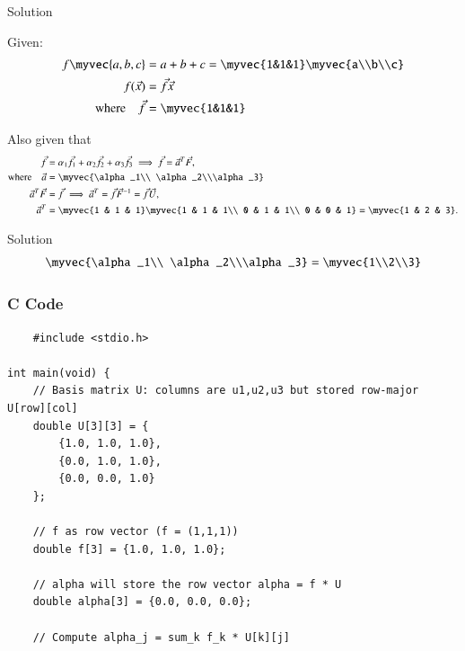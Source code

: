 \documentclass{beamer}
\begin{document}
\begin{frame}{Solution}

Given:
\begin{align}
f\myvec{a,b,c}&=a+b+c=\myvec{1&1&1}\myvec{a\\b\\c}\\
f(\vec{x})&=\vec{f}\vec{x} \\
\text{where}\quad \vec{f}&=\myvec{1&1&1}
\end{align}

Also given that
\begin{align}
\vec{f} &= \alpha_1 \vec{f}_1 + \alpha_2 \vec{f}_2 + \alpha_3 \vec{f}_3 
\implies \vec{f} = \vec{a}^T \vec{F}, \\
\text{where}\quad\vec{a}&=\myvec{\alpha_1\\ \alpha_2\\\alpha_3} \quad  \\
\vec{a}^T \vec{F} &= \vec{f} \implies \vec{a}^T = \vec{f} \vec{F}^{-1} = \vec{f} \vec{U}, \\
\vec{a}^T &= \myvec{1 & 1 & 1} \myvec{1 & 1 & 1\\ 0 & 1 & 1\\ 0 & 0 & 1} 
= \myvec{1 & 2 & 3}.
\end{align}
\end{frame}
\begin{frame}{Solution}
\begin{align}
\myvec{\alpha_1\\ \alpha_2\\\alpha_3} = \myvec{1\\2\\3}
\end{align}
\end{frame}
\begin{frame}[fragile]
\frametitle{C Code}
\begin{lstlisting}
    #include <stdio.h>

int main(void) {
    // Basis matrix U: columns are u1,u2,u3 but stored row-major U[row][col]
    double U[3][3] = {
        {1.0, 1.0, 1.0},
        {0.0, 1.0, 1.0},
        {0.0, 0.0, 1.0}
    };

    // f as row vector (f = (1,1,1))
    double f[3] = {1.0, 1.0, 1.0};

    // alpha will store the row vector alpha = f * U
    double alpha[3] = {0.0, 0.0, 0.0};

    // Compute alpha_j = sum_k f_k * U[k][j]
    \end{lstlisting}
    \end{frame}
\end{document}
